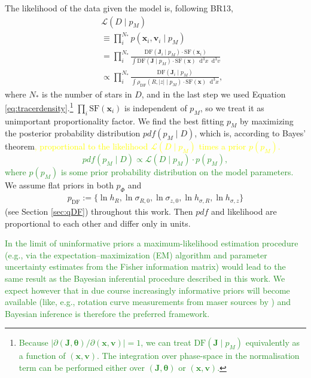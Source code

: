 \documentclass[iop,revtex4,numberedappendix,appendixfloats]{emulateapj}
\newcommand{\vect}[1]{\boldsymbol{#1}}
\newcommand*\Diff[1]{\mathop{}\!\mathrm{d^#1}}
\newcommand{\pdf}{\ensuremath{pdf}}
\newcommand{\pmodel}{\ensuremath{p_M}}
\newcommand{\NEW}[1]{\textcolor{ForestGreen}{#1}}
\newcommand{\OLD}[1]{\textcolor{Yellow}{#1}}%
\begin{document}
The likelihood of the data given the model is, following BR13,
\begin{eqnarray}
&&\mathscr{L}(D \mid \pmodel) \nonumber\\
&&\equiv \prod_i^{N_*} p(\vect{x}_i,\vect{v}_i \mid \pmodel) \nonumber\\
&&= \prod_i^{N_*} \frac{\text{DF}(\vect{J}_i \mid \pmodel) \cdot \text{SF}(\vect{x}_i)}{\int  \text{DF}(\vect{J} \mid \pmodel) \cdot \text{SF}(\vect{x})  \Diff 3 x \Diff 3 v}\nonumber\\
&&\propto \prod_i^{N_*} \frac{\text{DF}(\vect{J}_i \mid \pmodel)}{\int \rho_\text{DF}(R,|z| \mid \pmodel) \cdot \text{SF}(\vect{x}) \Diff 3 x}, \label{eq:prob}
\end{eqnarray}
where $N_*$ is the number of stars in $D$, and in the last step we used Equation \eqref{eq:tracerdensity}.\footnote{\NEW{Because $\left| \partial(\vect{J},\vect{\theta}) / \partial (\vect{x},\vect{v}) \right| = 1$, we can treat $\text{DF}(\vect{J} \mid \pmodel)$ equivalently as a function of $(\vect{x},\vect{v})$. The integration over phase-space in the normalisation term can be performed either over $(\vect{J},\vect{\theta})$ or $(\vect{x},\vect{v})$.}} $\prod_i\text{SF}(\vect{x}_i)$ is independent of \pmodel{}, so we treat it as unimportant proportionality factor. We find the best fitting \pmodel{} by maximizing the posterior probability distribution $\pdf{}(\pmodel \mid D)$, which is, according to Bayes' theorem\OLD{, proportional to the likelihood $\mathscr{L}(D\mid \pmodel)$ times a prior $p(\pmodel)$.}\NEW{
\begin{equation*}
\pdf{}(\pmodel \mid D) \propto \mathscr{L}(D\mid \pmodel) \cdot p(\pmodel),
\end{equation*}
where $p(\pmodel)$ is some prior probability distribution on the model parameters.} We assume flat priors in both $p_\Phi$ and
\begin{eqnarray}
p_\text{DF} := \{ \ln h_R, \ln \sigma_{R,0}, \ln \sigma_{z,0}, \ln h_{\sigma,R}, \ln h_{\sigma,z} \} \label{eq:p_DF}
\end{eqnarray}
(see Section \ref{sec:qDF}) throughout this work. Then \pdf{} and likelihood are proportional to each other and differ only in units.

\NEW{In the limit of uninformative priors a maximum-likelihood estimation procedure (e.g., via the expectation–maximization (EM) algorithm and parameter uncertainty estimates from the Fisher information matrix) would lead to the same result as the Bayesian inferential procedure described in this work. We expect however that in due course increasingly informative priors will become available (like, e.g., rotation curve measurements from maser sources by \citet{2009ApJ...700..137R}) and Bayesian inference is therefore the preferred framework.}
\end{document}
